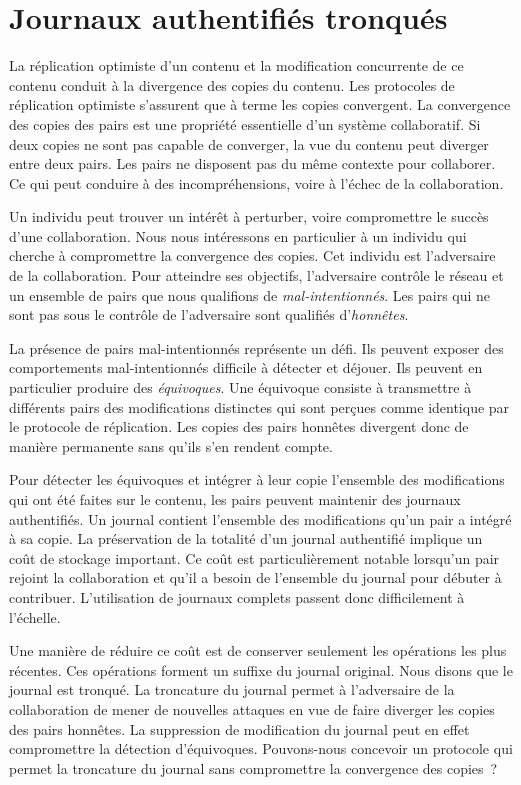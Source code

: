 
\chapter{Journaux authentifiés tronqués}
\label{ch:pruned-log}

\minitoc
\bigskip


La réplication optimiste d'un contenu et la modification concurrente de ce contenu conduit à la divergence des copies du contenu.
Les protocoles de réplication optimiste s'assurent que à terme les copies convergent.
La convergence des copies des pairs est une propriété essentielle d'un système collaboratif.
Si deux copies ne sont pas capable de converger, la vue du contenu peut diverger entre deux pairs.
Les pairs ne disposent pas du même contexte pour collaborer.
Ce qui peut conduire à des incompréhensions, voire à l'échec de la collaboration.

Un individu peut trouver un intérêt à perturber, voire compromettre le succès d'une collaboration.
Nous nous intéressons en particulier à un individu qui cherche à compromettre la convergence des copies.
Cet individu est l'adversaire de la collaboration.
Pour atteindre ses objectifs, l'adversaire contrôle le réseau et un ensemble de pairs que nous qualifions de \emph{mal-intentionnés}.
Les pairs qui ne sont pas sous le contrôle de l'adversaire sont qualifiés d'\emph{honnêtes}.

La présence de pairs mal-intentionnés représente un défi.
Ils peuvent exposer des comportements mal-intentionnés difficile à détecter et déjouer.
Ils peuvent en particulier produire des \emph{équivoques}.
Une équivoque consiste à transmettre à différents pairs des modifications distinctes qui sont perçues comme identique par le protocole de réplication.
Les copies des pairs honnêtes divergent donc de manière permanente sans qu'ils s'en rendent compte.

Pour détecter les équivoques et intégrer à leur copie l'ensemble des modifications qui ont été faites sur le contenu, les pairs peuvent maintenir des journaux authentifiés.
Un journal contient l'ensemble des modifications qu'un pair a intégré à sa copie.
La préservation de la totalité d'un journal authentifié implique un coût de stockage important.
Ce coût est particulièrement notable lorsqu'un pair rejoint la collaboration et qu'il a besoin de l'ensemble du journal pour débuter à contribuer.
L'utilisation de journaux complets passent donc difficilement à l'échelle.

Une manière de réduire ce coût est de conserver seulement les opérations les plus récentes.
Ces opérations forment un suffixe du journal original.
Nous disons que le journal est tronqué.
La troncature du journal permet à l'adversaire de la collaboration de mener de nouvelles attaques en vue de faire diverger les copies des pairs honnêtes.
La suppression de modification du journal peut en effet compromettre la détection d'équivoques.
Pouvons-nous concevoir un protocole qui permet la troncature du journal sans compromettre la convergence des copies~?

